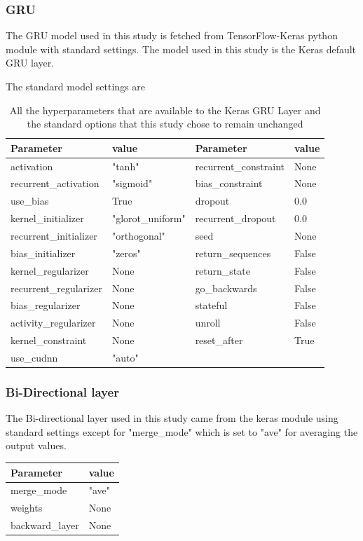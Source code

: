 \subsubsection{GRU}

The GRU model used in this study is fetched from TensorFlow-Keras python module with standard settings.  The model used in this study is the Keras default GRU layer. 

The standard model settings are

\begin{table}
	\begin{tabular}{l|l|l|l}
		Parameter&value&Parameter&value\\\hline
		activation&"tanh"&recurrent\_constraint&None\\
		recurrent\_activation&"sigmoid"&bias\_constraint&None\\
		use\_bias&True&dropout&0.0\\
		kernel\_initializer&"glorot\_uniform"&recurrent\_dropout&0.0\\
		recurrent\_initializer&"orthogonal"&seed&None\\
		bias\_initializer&"zeros"&return\_sequences&False\\
		kernel\_regularizer&None&return\_state&False\\
		recurrent\_regularizer&None&go\_backwards&False\\
		bias\_regularizer&None&stateful&False\\
		activity\_regularizer&None&unroll&False\\
		kernel\_constraint&None&reset\_after&True\\
		use\_cudnn&"auto"&&
	\end{tabular}
	\caption[GRU standard parameters]{All the hyperparameters that are available to the Keras GRU Layer and the standard options that this study chose to remain unchanged}
	\label{tab:gru:params}
\end{table}

\subsubsection{Bi-Directional layer}

The Bi-directional layer used in this study came from the keras module using standard settings except for "merge\_mode" which is set to "ave" for averaging the output values.

\begin{table}
	\begin{tabular}{l|l}
		Parameter&value\\\hline
		merge\_mode&"ave"\\
		weights&None\\
		backward\_layer&None
	\end{tabular}
\end{table}


